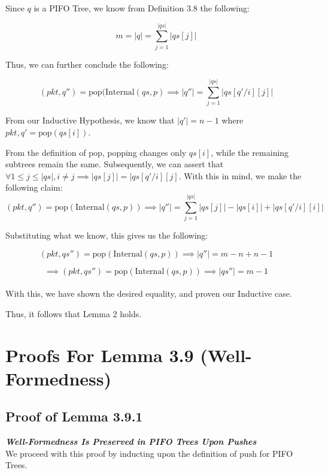 \documentclass{article}
\begin{document}
Since $q$ is a PIFO Tree, we know from Definition 3.8 the following:

$$m = |q| = \sum_{j=1}^{|qs|} |qs[j]|$$

Thus, we can further conclude the following:

$$(pkt, q'') = \text{pop}(\text{Internal}(qs, p) \implies |q''| = \sum_{j=1}^{|qs|} |qs[q'/i][j]|$$

From our Inductive Hypothesis, we know that $|q'| = n-1$ where $pkt, q' = \text{pop}(qs[i])$.\newline

From the definition of $\text{pop}$, popping changes only $qs[i]$, while the remaining subtrees remain the same. Subsequently, we can assert that $\forall 
1 \leq j \leq |qs|, i \neq j \implies |qs[j]| = |qs[q'/i][j]$. With this in mind, we make the following claim:\\[-15pt]

$$(pkt, q'') = \text{pop}(\text{Internal}(qs, p)) \implies |q''| = \sum_{j=1}^{|qs|} |qs[j]| - |qs[i]| + |qs[q'/i][i]|$$

Substituting what we know, this gives us the following:

$$(pkt, qs'') = \text{pop}(\text{Internal}(qs, p)) \implies |q''| = m - n + n - 1$$

$$\implies (pkt, qs'') = \text{pop}(\text{Internal}(qs, p)) \implies |qs''| = m - 1$$\\[-15pt]

With this, we have shown the desired equality, and proven our Inductive case.\newline

Thus, it follows that Lemma 2 holds.\newline


\section{Proofs For Lemma 3.9 (Well-Formedness)}

\subsection{Proof of Lemma 3.9.1}
\textit{\textbf{Well-Formedness Is Preserved in PIFO Trees Upon Pushes}}\\[10pt]

We proceed with this proof by inducting upon the definition of $\text{push}$ for PIFO Trees.\newline
\end{document}

